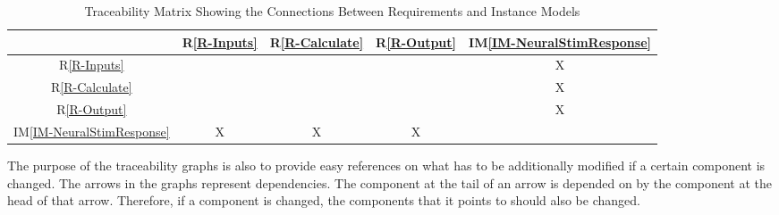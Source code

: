 \documentclass[12pt]{article}
\newcommand{\iref}[1]{IM\ref{#1}}
\newcommand{\rref}[1]{R\ref{#1}}
\begin{document}
\begin{table}[h!]
  \centering
  \begin{tabular}{|c|c|c|c|c|}
    \hline
    & \rref{R-Inputs} & \rref{R-Calculate} & \rref{R-Output} & \iref{IM-NeuralStimResponse} \\
    \hline
    \rref{R-Inputs} & & & & X \\ \hline
    \rref{R-Calculate} & & & & X \\ \hline
    \rref{R-Output} & & & & X \\ \hline
    \iref{IM-NeuralStimResponse} & X & X & X & \\ \hline
  \end{tabular}
  \caption{Traceability Matrix Showing the Connections Between Requirements and Instance Models}
  \label{Table:R-trace}
\end{table}

The purpose of the traceability graphs is also to provide easy references on
what has to be additionally modified if a certain component is changed.  The
arrows in the graphs represent dependencies. The component at the tail of an
arrow is depended on by the component at the head of that arrow. Therefore, if a
component is changed, the components that it points to should also be changed.




\end{document}
